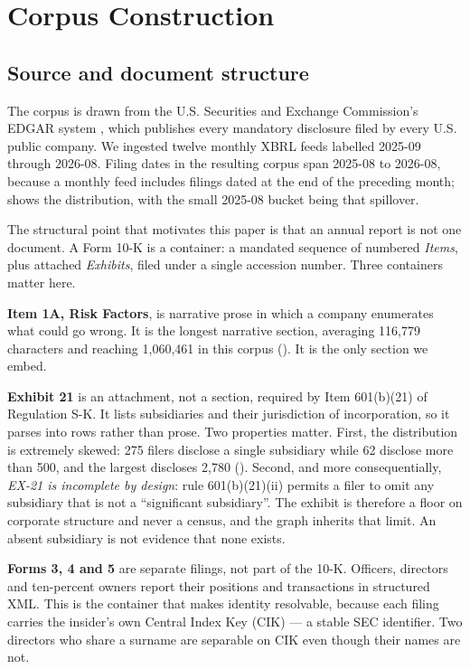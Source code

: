 \section{Corpus Construction}
\label{sec:dataset}

\subsection{Source and document structure}

The corpus is drawn from the U.S. Securities and Exchange Commission's EDGAR
system \citep{sec2024edgar}, which publishes every mandatory disclosure filed by
every U.S. public company. We ingested twelve monthly XBRL feeds labelled
2025-09 through 2026-08. Filing dates in the resulting corpus span 2025-08 to
2026-08, because a monthly feed includes filings dated at the end of the preceding
month;  shows the distribution, with the small 2025-08 bucket
being that spillover.

The structural point that motivates this paper is that an annual report is not one
document. A Form 10-K is a container: a mandated sequence of numbered
\emph{Items}, plus attached \emph{Exhibits}, filed under a single accession
number. Three containers matter here.

\textbf{Item 1A, Risk Factors}, is narrative prose in which a company enumerates
what could go wrong. It is the longest narrative section, averaging 116{,}779
characters and reaching 1{,}060{,}461 in this corpus (). It is the
only section we embed.

\textbf{Exhibit 21} is an attachment, not a section, required by Item 601(b)(21)
of Regulation S-K. It lists subsidiaries and their jurisdiction of incorporation,
so it parses into rows rather than prose. Two properties matter. First, the
distribution is extremely skewed: 275 filers disclose a single subsidiary while
62 disclose more than 500, and the largest discloses 2{,}780
(). Second, and more consequentially,
\emph{EX-21 is incomplete by design}: rule 601(b)(21)(ii) permits a filer to omit
any subsidiary that is not a ``significant subsidiary''. The exhibit is therefore
a floor on corporate structure and never a census, and the graph inherits that
limit. An absent subsidiary is not evidence that none exists.

\textbf{Forms 3, 4 and 5} are separate filings, not part of the 10-K. Officers,
directors and ten-percent owners report their positions and transactions in
structured XML. This is the container that makes identity resolvable, because each
filing carries the insider's own Central Index Key (CIK) --- a stable SEC
identifier. Two directors who share a surname are separable on CIK even though
their names are not.

